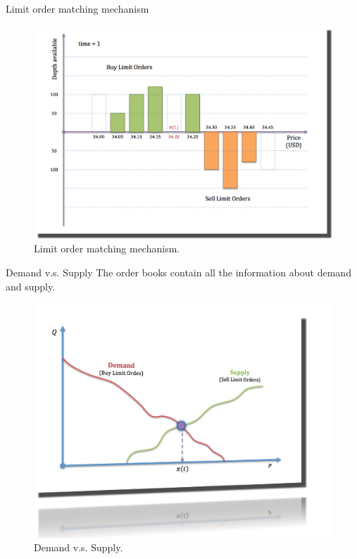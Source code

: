 \documentclass{beamer}
\begin{document}
\begin{frame}[shrink=30]{{\color{cyan}Limit order matching mechanism}}
\bigskip
\begin{figure}[H]
	\centering
	\includegraphics[height=0.9\textheight]{LOB_Match/LOB_Match_3.png}
        \caption{Limit order matching mechanism.}
        \label{fig:LOB_3}
\end{figure}
\end{frame}

\begin{frame}[shrink=30]{{\color{cyan}Demand v.s. Supply}}
\bigskip
The order books contain all the information about demand and supply.
\begin{figure}[htbp]
	\centering
	\includegraphics[height=0.9\textheight]{Demand_Supply.png}
        \caption{Demand v.s. Supply.}
        \label{fig:demand_supply}
\end{figure}

\end{frame}
\end{document}
